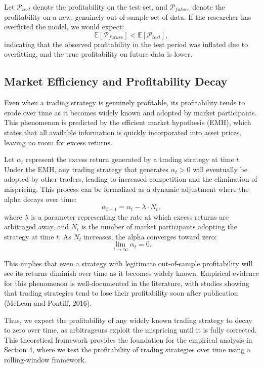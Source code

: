 Let $\mathcal{P}_{test}$ denote the profitability on the test set, and $\mathcal{P}_{future}$ denote the profitability on a new, genuinely out-of-sample set of data. If the researcher has overfitted the model, we would expect:
\[
\mathbb{E}[\mathcal{P}_{future}] < \mathbb{E}[\mathcal{P}_{test}],
\]
indicating that the observed profitability in the test period was inflated due to overfitting, and the true profitability on future data is lower.

\subsection{Market Efficiency and Profitability Decay}

Even when a trading strategy is genuinely profitable, its profitability tends to erode over time as it becomes widely known and adopted by market participants. This phenomenon is predicted by the efficient market hypothesis (EMH), which states that all available information is quickly incorporated into asset prices, leaving no room for excess returns.

Let $\alpha_t$ represent the excess return generated by a trading strategy at time $t$. Under the EMH, any trading strategy that generates $\alpha_t > 0$ will eventually be adopted by other traders, leading to increased competition and the elimination of mispricing. This process can be formalized as a dynamic adjustment where the alpha decays over time:
\[
\alpha_{t+1} = \alpha_t - \lambda \cdot N_t,
\]
where $\lambda$ is a parameter representing the rate at which excess returns are arbitraged away, and $N_t$ is the number of market participants adopting the strategy at time $t$. As $N_t$ increases, the alpha converges toward zero:
\[
\lim_{t \to \infty} \alpha_t = 0.
\]

This implies that even a strategy with legitimate out-of-sample profitability will see its returns diminish over time as it becomes widely known. Empirical evidence for this phenomenon is well-documented in the literature, with studies showing that trading strategies tend to lose their profitability soon after publication (McLean and Pontiff, 2016).

Thus, we expect the profitability of any widely known trading strategy to decay to zero over time, as arbitrageurs exploit the mispricing until it is fully corrected. This theoretical framework provides the foundation for the empirical analysis in Section 4, where we test the profitability of trading strategies over time using a rolling-window framework.
